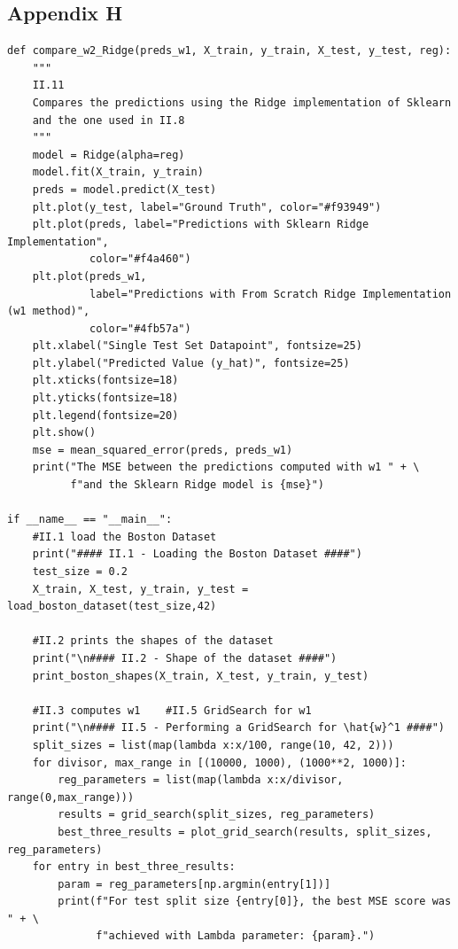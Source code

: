 \documentclass{homework}
\begin{document}
\subsection*{Appendix H}
\lstset{language=Python}
\lstset{frame=lines}
\lstset{basicstyle=\footnotesize}
\begin{lstlisting}
def compare_w2_Ridge(preds_w1, X_train, y_train, X_test, y_test, reg):
    """
    II.11
    Compares the predictions using the Ridge implementation of Sklearn
    and the one used in II.8
    """
    model = Ridge(alpha=reg)
    model.fit(X_train, y_train)
    preds = model.predict(X_test)
    plt.plot(y_test, label="Ground Truth", color="#f93949")
    plt.plot(preds, label="Predictions with Sklearn Ridge Implementation", 
             color="#f4a460")
    plt.plot(preds_w1, 
             label="Predictions with From Scratch Ridge Implementation (w1 method)", 
             color="#4fb57a")
    plt.xlabel("Single Test Set Datapoint", fontsize=25)
    plt.ylabel("Predicted Value (y_hat)", fontsize=25)
    plt.xticks(fontsize=18)
    plt.yticks(fontsize=18)
    plt.legend(fontsize=20)
    plt.show()
    mse = mean_squared_error(preds, preds_w1)
    print("The MSE between the predictions computed with w1 " + \ 
          f"and the Sklearn Ridge model is {mse}")

if __name__ == "__main__":
    #II.1 load the Boston Dataset
    print("#### II.1 - Loading the Boston Dataset ####")
    test_size = 0.2
    X_train, X_test, y_train, y_test = load_boston_dataset(test_size,42)

    #II.2 prints the shapes of the dataset
    print("\n#### II.2 - Shape of the dataset ####")
    print_boston_shapes(X_train, X_test, y_train, y_test)

    #II.3 computes w1    #II.5 GridSearch for w1
    print("\n#### II.5 - Performing a GridSearch for \hat{w}^1 ####")
    split_sizes = list(map(lambda x:x/100, range(10, 42, 2)))
    for divisor, max_range in [(10000, 1000), (1000**2, 1000)]:
        reg_parameters = list(map(lambda x:x/divisor, range(0,max_range)))
        results = grid_search(split_sizes, reg_parameters)
        best_three_results = plot_grid_search(results, split_sizes, reg_parameters)
    for entry in best_three_results:
        param = reg_parameters[np.argmin(entry[1])]
        print(f"For test split size {entry[0]}, the best MSE score was " + \
              f"achieved with Lambda parameter: {param}.")


\end{lstlisting}
\end{document}
